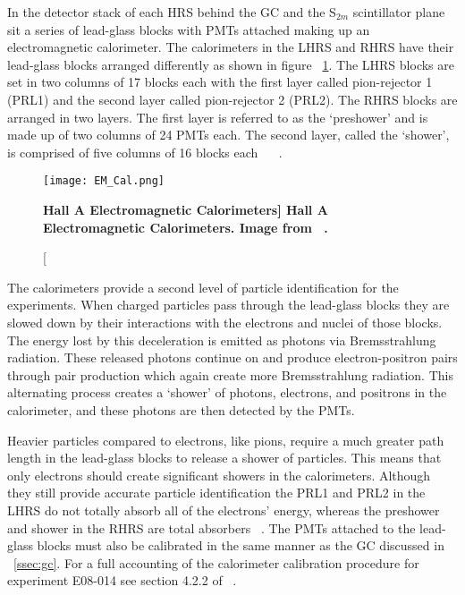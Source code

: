 In the detector stack of each HRS behind the GC and the S$_{2m}$ scintillator plane sit a series of lead-glass blocks with PMTs attached making up an electromagnetic calorimeter. The calorimeters in the LHRS and RHRS have their lead-glass blocks arranged differently as shown in figure ~\ref{fig:em_cal}. The LHRS blocks are set in two columns of 17 blocks each with the first layer called pion-rejector 1 (PRL1) and the second layer called pion-rejector 2 (PRL2). The RHRS blocks are arranged in two layers. The first layer is referred to as the `preshower' and is made up of two columns of 24 PMTs each. The second layer, called the `shower', is comprised of five columns of 16 blocks each ~\cite{Thesis:Ye} ~\cite{Article:HallA}. 

\begin{figure}[!ht]
\begin{center}
\texttt{[image: EM\_Cal.png]}
\end{center}
\caption[\bf{Hall A Electromagnetic Calorimeters}]{
{\bf{Hall A Electromagnetic Calorimeters.}} Image from ~\cite{Article:HallA}.}
\label{fig:em_cal}
\end{figure}

The calorimeters provide a second level of particle identification for the experiments. When charged particles pass through the lead-glass blocks they are slowed down by their interactions with the electrons and nuclei of those blocks. The energy lost by this deceleration is emitted as photons via Bremsstrahlung radiation. These released photons continue on and produce electron-positron pairs through pair production which again create more Bremsstrahlung radiation. This alternating process creates a `shower' of photons, electrons, and positrons in the calorimeter, and these photons are then detected by the PMTs. 

Heavier particles compared to electrons, like pions, require a much greater path length in the lead-glass blocks to release a shower of particles. This means that only electrons should create significant showers in the calorimeters. Although they still provide accurate particle identification the PRL1 and PRL2 in the LHRS do not totally absorb all of the electrons' energy, whereas the preshower and shower in the RHRS are total absorbers ~\cite{Thesis:Ye}. The PMTs attached to the lead-glass blocks must also be calibrated in the same manner as the GC discussed in ~\ref{ssec:gc}. For a full accounting of the calorimeter calibration procedure for experiment E08-014 see section 4.2.2 of ~\cite{Thesis:Ye}.

